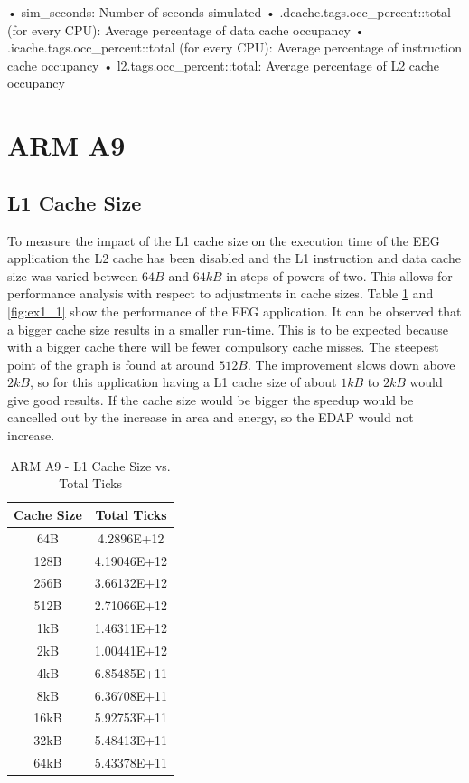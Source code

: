 \documentclass[a4paper, 10pt, conference]{ieeeconf}      %
\begin{document}
• sim_seconds: Number of seconds simulated
• .dcache.tags.occ_percent::total (for every CPU): Average
percentage of data cache occupancy
• .icache.tags.occ_percent::total (for every CPU): Average
percentage of instruction cache occupancy
• l2.tags.occ_percent::total: Average percentage of L2
cache occupancy

\section{ARM A9}

\subsection{L1 Cache Size}

To measure the impact of the L1 cache size on the execution time of the EEG application the L2 cache has been disabled and the L1 instruction and data cache size was varied between $64B$ and $64kB$ in steps of powers of two. This allows for performance analysis with respect to adjustments in cache sizes. Table \ref{tab:A9_L1} and \ref{fig:ex1_1} show the performance of the EEG application. It can be observed that a bigger cache size results in a smaller run-time. This is to be expected because with a bigger cache there will be fewer compulsory cache misses. The steepest point of the graph is found at around $512B$. The improvement slows down above $2kB$, so for this application having a L1 cache size of about $1kB$ to $2kB$ would give good results. If the cache size would be bigger the speedup would be cancelled out by the increase in area and energy, so the EDAP would not increase.

\begin{table}[h]
\caption{ARM A9 - L1 Cache Size vs. Total Ticks}
\label{tab:A9_L1}
\begin{center}
\begin{tabular}{|c||c|}
\hline
Cache Size & Total Ticks\\
\hline
64B & 4.2896E+12\\
\hline
128B & 4.19046E+12\\
\hline
256B & 3.66132E+12\\
\hline
512B & 2.71066E+12\\
\hline
1kB & 1.46311E+12\\
\hline
2kB & 1.00441E+12\\
\hline
4kB & 6.85485E+11\\
\hline
8kB & 6.36708E+11\\
\hline
16kB & 5.92753E+11\\
\hline
32kB & 5.48413E+11\\
\hline
64kB & 5.43378E+11\\
\hline

\end{tabular}
\end{center}
\end{table}
\end{document}
